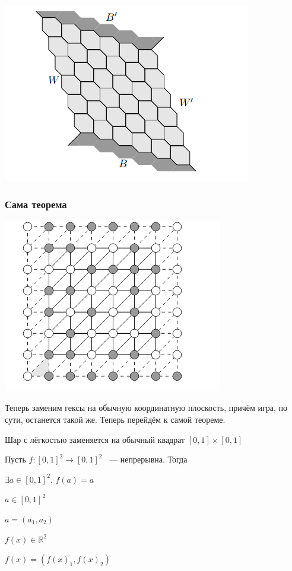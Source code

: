 \documentclass{article}
\begin{document}
			\includegraphics[scale=0.5]{HEX.png}
				
		\subsubsection{Сама теорема}
		
			\includegraphics[scale=0.45]{NEWHEX.png}
		
			Теперь заменим гексы на обычную координатную плоскость, причём игра, по сути, останется такой же. Теперь перейдём к самой теореме.
			
			Шар с лёгкостью заменяется на обычный квадрат $[0, 1] \times [0, 1]$
			
			Пусть $f : [0, 1]^2 \rightarrow [0, 1]^2$ ~--- непрерывна. Тогда
			
			$\exists a \in [0, 1]^2$, $f(a) = a$
			
			$a \in [0, 1]^2$
			
			$a = (a_1, a_2)$
			
			$f(x) \in \mathbb{R}^2$
			
			$f(x) = (f(x)_1, f(x)_2)$
			
\end{document}
